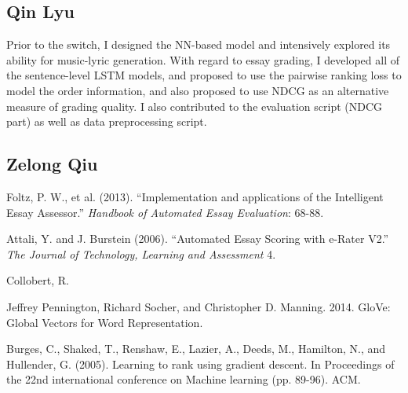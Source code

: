 \documentclass[10pt,psamsfonts]{amsart}
\theoremstyle{definition}
\theoremstyle{remark}
\numberwithin{equation}{section}
\begin{document}
\subsection*{Qin Lyu}

Prior to the switch, I designed the NN-based model and intensively explored its ability for music-lyric generation. With regard to essay grading, I developed all of the sentence-level LSTM models, and proposed to use the pairwise ranking loss to model the order information, and also proposed to use NDCG as an alternative measure of grading quality. I also contributed to the evaluation script (NDCG part) as well as data preprocessing script.

\subsection*{Zelong Qiu}

\begin{thebibliography}{99}
Foltz, P. W., et al. (2013). ``Implementation and applications of the Intelligent Essay Assessor.'' {\em Handbook of Automated Essay Evaluation}: 68-88.

Attali, Y. and J. Burstein (2006). ``Automated Essay Scoring with e-Rater V2.'' {\em The Journal of Technology, Learning and Assessment} 4.

Collobert, R.

Jeffrey Pennington, Richard Socher, and Christopher D. Manning. 2014. GloVe: Global Vectors for Word Representation.

Burges, C., Shaked, T., Renshaw, E., Lazier, A., Deeds, M., Hamilton, N., and Hullender, G. (2005). Learning to rank using gradient descent. In Proceedings of the 22nd international conference on Machine learning (pp. 89-96). ACM.


\end{thebibliography}
\end{document}
